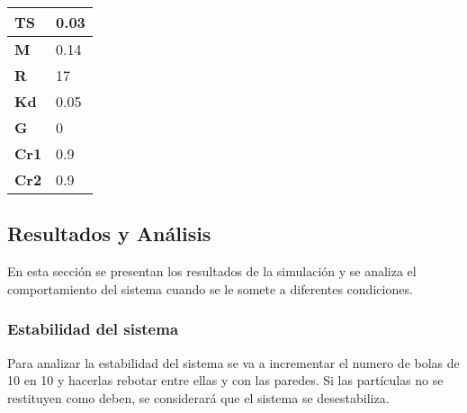 \documentclass{article}
\begin{document}
\begin{table}[h]
    \centering
    \begin{tabular}{|l|l|}
        \hline
        \textbf{TS}  & 0.03 \\ \hline
        \textbf{M}   & 0.14 \\ \hline
        \textbf{R}   & 17   \\ \hline
        \textbf{Kd}  & 0.05 \\ \hline
        \textbf{G}   & 0    \\ \hline
        \textbf{Cr1} & 0.9  \\ \hline
        \textbf{Cr2} & 0.9  \\ \hline
    \end{tabular}
\end{table}

\subsection{Resultados y Análisis}\label{sec:bf-resultados}

En esta sección se presentan los resultados de la simulación y se analiza el comportamiento del sistema cuando se le somete a diferentes condiciones.

\subsubsection{Estabilidad del sistema}\label{sec:bf-estabilidad}

Para analizar la estabilidad del sistema se va a incrementar el numero de bolas de 10 en 10 y hacerlas rebotar entre ellas y con las paredes. Si las partículas no se restituyen como deben, se considerará que el sistema se desestabiliza.
\end{document}
